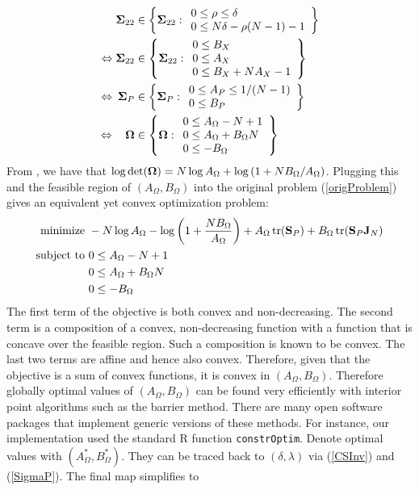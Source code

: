 \documentclass[12pt]{article}
\DeclareMathOperator{\tr}{tr}
\theoremstyle{definition}
\theoremstyle{definition}
\begin{document}
\begin{align*}
{\bf\Sigma}_{22} &\in \left\{ {\bf\Sigma}_{22} : 
\begin{array}{ll}
0 \leq \rho \leq \delta\\
0 \leq N\delta -\rho(N-1)-1\\
\end{array} \right\}\\
\Leftrightarrow 
{\bf\Sigma}_{22} &\in \left\{ {\bf\Sigma}_{22} : 
\begin{array}{ll}
0 \leq B_X\\
0 \leq A_X\\
0 \leq B_X+NA_X-1
\end{array} \right\}\\
\Leftrightarrow \hspace{0.2em}
{\bf\Sigma}_{P} &\in \left\{ {\bf\Sigma}_{P} : 
\begin{array}{ll}
0 \leq A_P \leq 1/(N-1)\\
0 \leq B_P
\end{array} \right\}\\
\Leftrightarrow \hspace{0.9em}
 {\bf\Omega} &\in \left\{ {\bf\Omega} : 
\begin{array}{ll}
0 \leq A_\Omega -N+1\\
0 \leq A_\Omega + B_\Omega N\\ 
0 \leq -B_\Omega
\end{array} \right\}
\end{align*}
From \citet{rao2009linear}, we have that $\log \det ({\bf\Omega}) = N\log A_\Omega + \log \left( 1+ NB_\Omega/A_\Omega \right)$. 
Plugging this and the feasible region of $(A_\Omega, B_\Omega)$ into the original problem (\ref{origProblem}) gives an equivalent yet convex optimization problem:
\begin{align*}
\text{minimize } & -N\log A_\Omega - \log \left( 1+\frac{NB_\Omega}{A_\Omega} \right)  + A_\Omega \tr({\bf S}_P) +B_\Omega \tr({\bf S}_P{\bf J}_N) \\
 \text{subject to } & 0 \leq A_\Omega -N+1\\
& 0 \leq A_\Omega +B_\Omega N  \\ 
& 0 \leq -B_\Omega
\end{align*}
The first term of the objective is both convex and non-decreasing. The second term is a composition of a convex, non-decreasing function with a function that is concave over the feasible region. Such a composition is known to be convex. The last two terms are affine and hence also convex. Therefore, given that the objective is a sum of convex functions, it is convex in $(A_\Omega, B_\Omega)$. Therefore globally optimal values of $(A_\Omega, B_\Omega)$ can be found very efficiently with interior point algorithms such as the barrier method. There are many open software packages that implement generic versions of these methods. For instance, our implementation used the standard R function \texttt{constrOptim}. Denote optimal values with $(A_\Omega^*, B_\Omega^*)$. They can be traced back to $(\delta, \lambda)$ via (\ref{CSInv}) and (\ref{SigmaP}). The final map simplifies to
\end{document}
